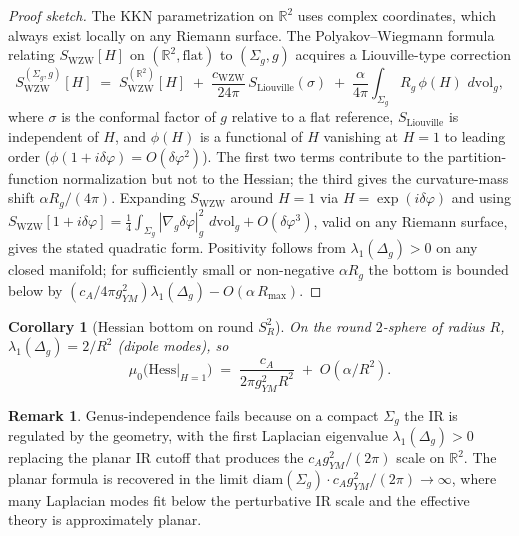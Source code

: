 \documentclass[11pt,letterpaper]{article}
\newtheorem{corollary}[theorem]{Corollary}
\theoremstyle{definition}
\newtheorem{remark}[theorem]{Remark}
\newcommand{\bbR}{\mathbb{R}}
\newcommand{\Hess}{\mathrm{Hess}}
\newcommand{\dvol}{\,d\mathrm{vol}}
\begin{document}
\begin{proof}[Proof sketch]
The KKN parametrization on $\bbR^2$ uses complex coordinates, which always exist locally on any Riemann surface. The Polyakov--Wiegmann formula relating $S_{\mathrm{WZW}}[H]$ on $(\bbR^2, \mathrm{flat})$ to $(\Sigma_g, g)$ acquires a Liouville-type correction
\[
S_{\mathrm{WZW}}^{(\Sigma_g, g)}[H] \;=\; S_{\mathrm{WZW}}^{(\bbR^2)}[H] \;+\; \frac{c_{\mathrm{WZW}}}{24\pi}\,S_{\mathrm{Liouville}}(\sigma) \;+\; \frac{\alpha}{4\pi}\int_{\Sigma_g} R_g\,\phi(H)\,\dvol_g,
\]
where $\sigma$ is the conformal factor of $g$ relative to a flat reference, $S_{\mathrm{Liouville}}$ is independent of $H$, and $\phi(H)$ is a functional of $H$ vanishing at $H = 1$ to leading order ($\phi(1+i\delta\varphi) = O(\delta\varphi^2)$). The first two terms contribute to the partition-function normalization but not to the Hessian; the third gives the curvature-mass shift $\alpha R_g/(4\pi)$. Expanding $S_{\mathrm{WZW}}$ around $H = 1$ via $H = \exp(i\delta\varphi)$ and using $S_{\mathrm{WZW}}[1+i\delta\varphi] = \tfrac{1}{4}\int_{\Sigma_g}|\nabla_g\delta\varphi|^2_g\,\dvol_g + O(\delta\varphi^3)$, valid on any Riemann surface, gives the stated quadratic form. Positivity follows from $\lambda_1(\Delta_g) > 0$ on any closed manifold; for sufficiently small or non-negative $\alpha R_g$ the bottom is bounded below by $(c_A/4\pi g^2_{YM})\lambda_1(\Delta_g) - O(\alpha\,R_{\max})$.
\end{proof}

\begin{corollary}[Hessian bottom on round $S^2_R$]\label{cor:KKN-S2}
On the round $2$-sphere of radius $R$, $\lambda_1(\Delta_g) = 2/R^2$ (dipole modes), so
\[
\mu_0\bigl(\Hess|_{H=1}\bigr) \;=\; \frac{c_A}{2\pi g^2_{YM} R^2} \;+\; O(\alpha/R^2).
\]
\end{corollary}

\begin{remark}\label{rmk:KKN-Sigma-g-correction}
Genus-independence fails because on a compact $\Sigma_g$ the IR is regulated by the geometry, with the first Laplacian eigenvalue $\lambda_1(\Delta_g) > 0$ replacing the planar IR cutoff that produces the $c_A g^2_{YM}/(2\pi)$ scale on $\bbR^2$. The planar formula is recovered in the limit $\mathrm{diam}(\Sigma_g)\cdot c_A g^2_{YM}/(2\pi) \to \infty$, where many Laplacian modes fit below the perturbative IR scale and the effective theory is approximately planar.
\end{remark}
\end{document}
